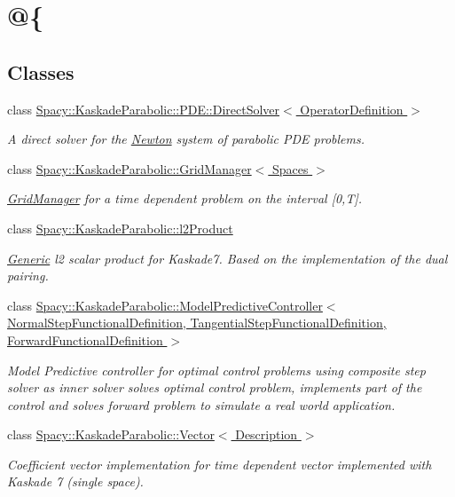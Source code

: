 \hypertarget{group__KaskadeParabolicGroup}{\section{@\{}
\label{group__KaskadeParabolicGroup}
}
\subsection*{Classes}
\begin{DoxyCompactItemize}
\item 
class \hyperlink{classSpacy_1_1KaskadeParabolic_1_1PDE_1_1DirectSolver}{Spacy\-::\-Kaskade\-Parabolic\-::\-P\-D\-E\-::\-Direct\-Solver$<$ Operator\-Definition $>$}
\begin{DoxyCompactList}\small\item\em A direct solver for the \hyperlink{namespaceSpacy_1_1Newton}{Newton} system of parabolic P\-D\-E problems. \end{DoxyCompactList}\item 
class \hyperlink{classSpacy_1_1KaskadeParabolic_1_1GridManager}{Spacy\-::\-Kaskade\-Parabolic\-::\-Grid\-Manager$<$ Spaces $>$}
\begin{DoxyCompactList}\small\item\em \hyperlink{classSpacy_1_1KaskadeParabolic_1_1GridManager}{Grid\-Manager} for a time dependent problem on the interval \mbox{[}0,T\mbox{]}. \end{DoxyCompactList}\item 
class \hyperlink{classSpacy_1_1KaskadeParabolic_1_1l2Product}{Spacy\-::\-Kaskade\-Parabolic\-::l2\-Product}
\begin{DoxyCompactList}\small\item\em \hyperlink{namespaceSpacy_1_1Generic}{Generic} l2 scalar product for Kaskade7. Based on the implementation of the dual pairing. \end{DoxyCompactList}\item 
class \hyperlink{classSpacy_1_1KaskadeParabolic_1_1ModelPredictiveController}{Spacy\-::\-Kaskade\-Parabolic\-::\-Model\-Predictive\-Controller$<$ Normal\-Step\-Functional\-Definition, Tangential\-Step\-Functional\-Definition, Forward\-Functional\-Definition $>$}
\begin{DoxyCompactList}\small\item\em Model Predictive controller for optimal control problems using composite step solver as inner solver solves optimal control problem, implements part of the control and solves forward problem to simulate a real world application. \end{DoxyCompactList}\item 
class \hyperlink{classSpacy_1_1KaskadeParabolic_1_1Vector}{Spacy\-::\-Kaskade\-Parabolic\-::\-Vector$<$ Description $>$}
\begin{DoxyCompactList}\small\item\em Coefficient vector implementation for time dependent vector implemented with Kaskade 7 (single space). \end{DoxyCompactList}\end{DoxyCompactItemize}
